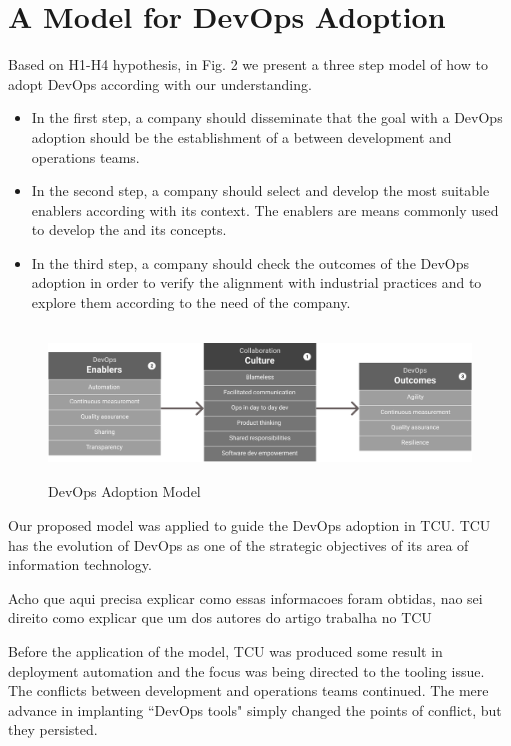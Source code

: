 \section{A Model for DevOps Adoption}\label{sec:case_study}

Based on H1-H4 hypothesis, in Fig. 2 we present a three step model of how to
adopt DevOps according with our understanding.

\begin{itemize}
\item In the first step, a company should 
disseminate that the goal with a DevOps adoption should be
the establishment of a  between
development and operations teams.

\item In the second step, a company should select and develop
the most suitable enablers according with its context. The enablers
are means commonly used to develop the 
and its concepts.

\item In the third step, a company should check the outcomes of the
DevOps adoption in order to verify the alignment with
industrial practices and to explore them according to the
need of the company.
\end{itemize}

\begin{figure}[H]
  \centering
    \includegraphics[width=14.26cm,height=4cm,natwidth=1116,natheight=313]{model.png}
    \caption{DevOps Adoption Model}
    \label{fig2}
\end{figure}


Our proposed model was applied to guide the DevOps adoption in TCU. TCU has the
evolution of DevOps as one of the strategic objectives of its area of
information technology.

{\color{red} Acho que aqui precisa explicar como essas informacoes foram
obtidas, nao sei direito como explicar que um dos autores do artigo trabalha no
TCU}

Before the application of the model, TCU was produced some result in deployment
automation and the focus was being directed to the tooling issue. The conflicts
between development and operations teams continued. The mere advance in
implanting ``DevOps tools" simply changed the points of conflict, but they
persisted.

